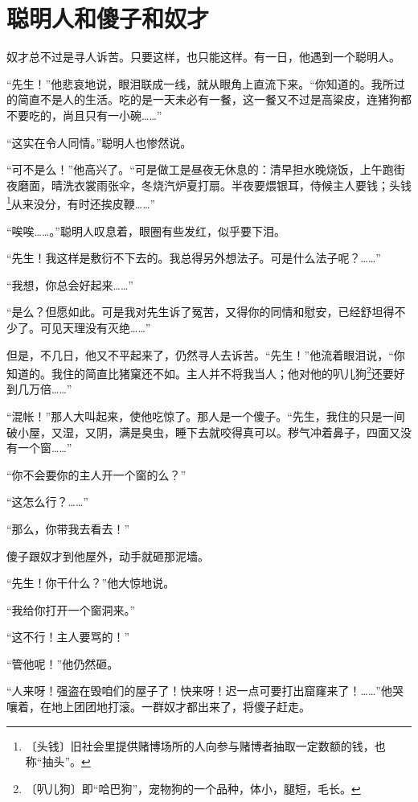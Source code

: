 \documentclass[12pt,UTF-8,openany]{ctexbook}
\begin{document}
\chapter{聪明人和傻子和奴才}

\begin{large}
    
    奴才总不过是寻人诉苦。只要这样，也只能这样。有一日，他遇到一个聪明人。
    
    “先生！”他悲哀地说，眼泪联成一线，就从眼角上直流下来。“你知道的。我所过的简直不是人的生活。吃的是一天未必有一餐，这一餐又不过是高粱皮，连猪狗都不要吃的，尚且只有一小碗……”
    
    “这实在令人同情。”聪明人也惨然说。
    
    “可不是么！”他高兴了。“可是做工是昼夜无休息的：清早担水晚烧饭，上午跑街夜磨面，晴洗衣裳雨张伞，冬烧汽炉夏打扇。半夜要煨银耳，侍候主人要钱；头钱\footnote{〔头钱〕旧社会里提供赌博场所的人向参与赌博者抽取一定数额的钱，也称“抽头”。}从来没分，有时还挨皮鞭……”
    
    “唉唉……。”聪明人叹息着，眼圈有些发红，似乎要下泪。
    
    “先生！我这样是敷衍不下去的。我总得另外想法子。可是什么法子呢？……”
    
    “我想，你总会好起来……”
    
    “是么？但愿如此。可是我对先生诉了冤苦，又得你的同情和慰安，已经舒坦得不少了。可见天理没有灭绝……”
    
    但是，不几日，他又不平起来了，仍然寻人去诉苦。“先生！”他流着眼泪说，“你知道的。我住的简直比猪窠还不如。主人并不将我当人；他对他的叭儿狗\footnote{〔叭儿狗〕即“哈巴狗”，宠物狗的一个品种，体小，腿短，毛长。}还要好到几万倍……”
    
    “混帐！”那人大叫起来，使他吃惊了。那人是一个傻子。“先生，我住的只是一间破小屋，又湿，又阴，满是臭虫，睡下去就咬得真可以。秽气冲着鼻子，四面又没有一个窗……”
    
    “你不会要你的主人开一个窗的么？”
    
    “这怎么行？……”
    
    “那么，你带我去看去！”
    
    傻子跟奴才到他屋外，动手就砸那泥墙。
    
    “先生！你干什么？”他大惊地说。
    
    “我给你打开一个窗洞来。”
    
    “这不行！主人要骂的！”
    
    “管他呢！”他仍然砸。
    
    “人来呀！强盗在毁咱们的屋子了！快来呀！迟一点可要打出窟窿来了！……”他哭嚷着，在地上团团地打滚。一群奴才都出来了，将傻子赶走。
    

\end{large}
\end{document}
